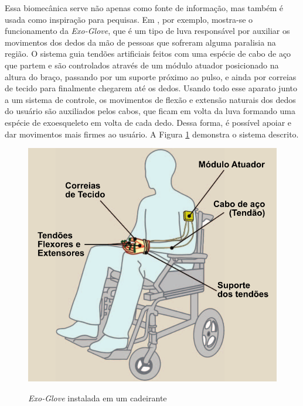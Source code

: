 \documentclass[
	12pt,				%
	openright,			%
	oneside,			%
	a4paper,			%
	english,			%
	brazil				%
	]{abntex2}
\begin{document}
		Essa biomecânica serve não apenas como fonte de informação, mas também é usada como inspiração para pequisas. Em \cite{hyunki2015exoglove}, por exemplo, mostra-se o funcionamento da \textit{Exo-Glove}, que é um tipo de luva responsável por auxiliar os movimentos dos dedos da mão de pessoas que sofreram alguma paralisia na região. O sistema guia tendões artificiais feitos com uma espécie de cabo de aço que partem e são controlados através de um módulo atuador posicionado na altura do braço, passando por um suporte próximo ao pulso, e ainda por correias de tecido para finalmente chegarem até os dedos. Usando todo esse aparato junto a um sistema de controle, os movimentos de flexão e extensão naturais dos dedos do usuário são auxiliados pelos cabos, que ficam em volta da luva formando uma espécie de exoesqueleto em volta de cada dedo. Dessa forma, é possível apoiar e dar movimentos mais firmes ao usuário. A Figura \ref{Fig:exo-glove-installed1} demonstra o sistema descrito.





		\begin{figure}[h!]
			\centering
			\caption{\textit{Exo-Glove} instalada em um cadeirante}
  		\includegraphics[scale=0.5]{./figures/exo-glove-installed1.png}
  		\label{Fig:exo-glove-installed1}
		\end{figure}
		
\end{document}

